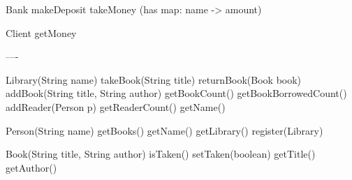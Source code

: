 \documentclass{article}
\begin{document}
Bank
  makeDeposit
  takeMoney
  (has map: name -> amount)

Client
  getMoney

----
  
Library(String name)
  takeBook(String title)
  returnBook(Book book)
  addBook(String title, String author)
  getBookCount()
  getBookBorrowedCount()
  addReader(Person p)
  getReaderCount()
  getName()

Person(String name)
  getBooks() 
  getName()
  getLibrary()
  register(Library)

Book(String title, String author)
  isTaken()
  setTaken(boolean)
  getTitle()
  getAuthor()
\end{document}
